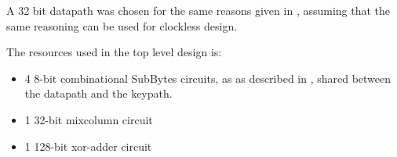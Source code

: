 A 32 bit datapath was chosen for the same reasons given in
\cite{ekelund}, assuming that the same reasoning can be used for
clockless design.

The resources used in the top level design is:
\begin{itemize}
   \item 4 8-bit combinational SubBytes circuits, as as described in \cite{combsbox}, shared between the datapath and the keypath.
   \item 1 32-bit mixcolumn circuit
   \item 1 128-bit xor-adder circuit
\end{itemize}
